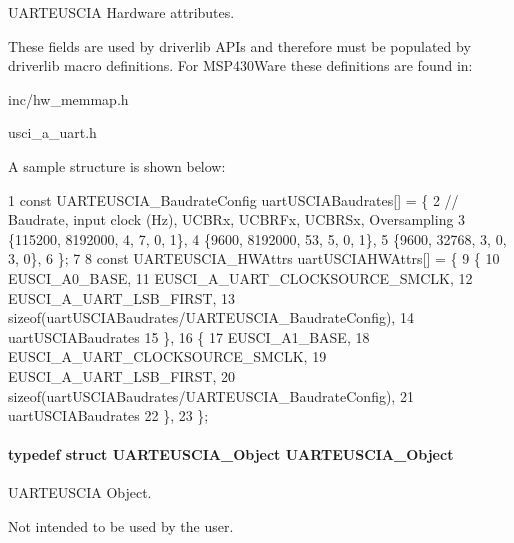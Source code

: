 U\+A\+R\+T\+E\+U\+S\+C\+I\+A Hardware attributes. 

These fields are used by driverlib A\+P\+Is and therefore must be populated by driverlib macro definitions. For M\+S\+P430\+Ware these definitions are found in\+:
\begin{DoxyItemize}
\item inc/hw\+\_\+memmap.\+h
\item usci\+\_\+a\+\_\+uart.\+h
\end{DoxyItemize}

A sample structure is shown below\+: 
\begin{DoxyCode}
1 const UARTEUSCIA\_BaudrateConfig uartUSCIABaudrates[] = \{
2  // Baudrate, input clock (Hz), UCBRx, UCBRFx, UCBRSx, Oversampling
3     \{115200,  8192000,          4,     7,      0,      1\},
4     \{9600,    8192000,          53,    5,      0,      1\},
5     \{9600,    32768,            3,     0,      3,      0\},
6 \};
7 
8 const UARTEUSCIA\_HWAttrs uartUSCIAHWAttrs[] = \{
9     \{
10         EUSCI\_A0\_BASE,
11         EUSCI\_A\_UART\_CLOCKSOURCE\_SMCLK,
12         EUSCI\_A\_UART\_LSB\_FIRST,
13         sizeof(uartUSCIABaudrates/UARTEUSCIA\_BaudrateConfig),
14         uartUSCIABaudrates
15     \},
16     \{
17         EUSCI\_A1\_BASE,
18         EUSCI\_A\_UART\_CLOCKSOURCE\_SMCLK,
19         EUSCI\_A\_UART\_LSB\_FIRST,
20         sizeof(uartUSCIABaudrates/UARTEUSCIA\_BaudrateConfig),
21         uartUSCIABaudrates
22     \},
23 \};
\end{DoxyCode}
\paragraph[{U\+A\+R\+T\+E\+U\+S\+C\+I\+A\+\_\+\+Object}]{\setlength{\rightskip}{0pt plus 5cm}typedef struct {\bf U\+A\+R\+T\+E\+U\+S\+C\+I\+A\+\_\+\+Object}  {\bf U\+A\+R\+T\+E\+U\+S\+C\+I\+A\+\_\+\+Object}}\label{_u_a_r_t_e_u_s_c_i_a_8h_ace543e3e62c1500d7a6f1c2b96c139d1}


U\+A\+R\+T\+E\+U\+S\+C\+I\+A Object. 

Not intended to be used by the user. 
